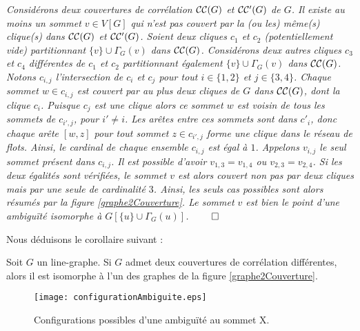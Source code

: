 \begin{Proof} 
{\em
	Consid\'erons deux couvertures de corr\'elation ${\cal CC}(G)$ et ${\cal CC'}(G)$ de $G$. 
	Il existe au moins un sommet $v \in V[G]$ qui n'est pas couvert par la (ou les) m\^eme(s) clique(s) dans  ${\cal CC}(G)$ et ${\cal CC'}(G)$.
	Soient deux cliques $c_1$ et $c_2$ (potentiellement vide) partitionnant $\{v\} \cup \Gamma_{G}(v)$ dans ${\cal CC}(G)$.
	Consid\'erons deux autres cliques $c_3$ et $c_4$ diff\'erentes de $c_1$ et $c_2$ partitionnant \'egalement $\{v\} \cup \Gamma_{G}(v)$ dans ${\cal CC}(G)$. 
	\newline
	Notons $c_{i,j}$ l'intersection de $c_{i}$ et $c_j$ pour tout $i \in \{1,2\}$ et $j \in \{3,4\}$. 
	Chaque sommet $w \in c_{i,j}$ est couvert par au plus deux cliques de $G$ dans ${\cal CC}(G)$, dont la clique $c_i$.
	Puisque $c_j$ est une clique alors ce sommet $w$ est voisin de tous les sommets de  $c_{i',j}$, pour $i' \ne i$.
	Les ar\^etes entre ces sommets sont dans $c'_i$, donc chaque ar\^ete $[w,z]$ pour tout sommet  $z \in c_{i',j}$ forme une clique dans le r\'eseau de flots.
	Ainsi, le cardinal de chaque ensemble  $c_{i,j}$ est \'egal \`a $1$.\newline
	Appelons $v_{i,j}$ le seul sommet pr\'esent dans $c_{i,j}$. 
	Il est possible d'avoir $v_{1,3} = v_{1,4}$ ou $v_{2,3} = v_{2,4}$.
	Si les deux \'egalit\'es sont v\'erifi\'ees, le sommet $v$ est alors couvert non pas par deux cliques mais par une seule de cardinalit\'e $3$.
	Ainsi, les seuls cas possibles sont alors r\'esum\'es par la figure  \ref{graphe2Couverture}.
	Le sommet $v$ est bien le point d'une ambigu\"{i}t\'e isomorphe \`a $G[\{u\} \cup \Gamma_{G}(u)]$.
} 
\hspace{16 em}$\qed$
\end{Proof}

Nous d\'eduisons le corollaire suivant :
\begin{corollary}
\label{corollaireGraphe2couverture}
Soit $G$ un line-graphe. 
\newline
Si $G$ admet deux couvertures de corr\'elation diff\'erentes, alors il est isomorphe \`a l'un des graphes de la figure  \ref{graphe2Couverture}.
\end{corollary}

\begin{figure}[htb!]\vspace{-0.5em}
	\centering
	\texttt{[image: configurationAmbiguite.eps]}\vspace{-0.5em}
	\caption{ Configurations possibles d'une ambigu\"{i}t\'e au sommet X. }\vspace{-0.5em}
	\label{configurationAmbiguite}
\end{figure}
\FloatBarrier


